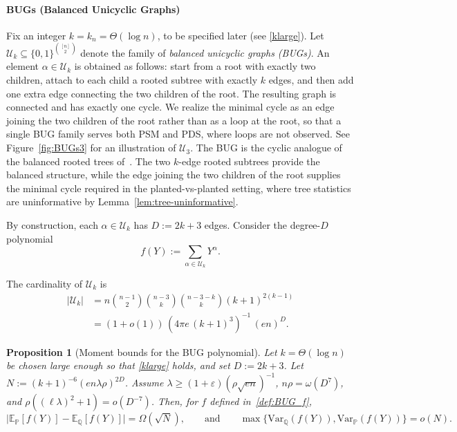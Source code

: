 \documentclass[11pt, letterpaper]{article}
\newtheorem{proposition}[theorem]{Proposition}
\numberwithin{equation}{section}
\newcommand{\E}{\mathbb{E}}
\newcommand{\PP}{\mathbb{P}}
\newcommand{\QQ}{\mathbb{Q}}
\begin{document}
\paragraph*{ 
BUGs (Balanced Unicyclic Graphs)}
Fix an integer $k=k_n=\Theta(\log n)$, to be specified later (see \eqref{klarge}). Let $\mathcal{U}_k \subseteq \{0,1\}^{\binom{[n]}{2}}$
denote the family of \emph{balanced unicyclic graphs (BUGs)}. An element $\alpha\in\mathcal{U}_k$ is obtained as follows:
start from a root with exactly two children, attach to each child a rooted subtree with exactly $k$ edges, and then add one extra edge connecting the two children of the root. The resulting graph is connected and has exactly one cycle. We realize the minimal cycle as an edge joining the two children of the root rather than as a loop at the root, so that a single BUG family serves both PSM and PDS, where loops are not observed. See Figure~\ref{fig:BUGs3} for an illustration of $\mathcal{U}_3$. The BUG is the cyclic analogue of the balanced rooted trees of~\cite{sohn2025sharp}. The two $k$-edge rooted subtrees provide the balanced structure, while the edge joining the two children of the root supplies the minimal cycle required in the planted-vs-planted setting, where tree statistics are uninformative by Lemma~\ref{lem:tree-uninformative}.

\noindent By construction, each $\alpha\in\mathcal{U}_k$ has $D := 2k+3$
edges. Consider the degree-$D$ polynomial
\begin{equation}\label{def:BUG_f}
f(Y) := \sum_{\alpha\in\mathcal{U}_k} Y^\alpha .
\end{equation}

\noindent The cardinality of $\mathcal U_k$ is
\begin{align}\label{eq:size-U_k-app}
|\mathcal{U}_k|
\nonumber &= n \binom{n-1}{2}  \binom{n-3}{k} \binom{n-3-k}{k} (k+1)^{2(k-1)}\\
 &= (1+o(1))\,\left(4\pi e\,(k+1)^3\right)^{-1}\,(en)^D.
\end{align}

\begin{proposition}[Moment bounds for the BUG polynomial]\label{prop:BUG-moments} Let $k=\Theta(\log n)$ be chosen large enough so that \eqref{klarge} holds, and set $D:=2k+3$. Let $N:=(k+1)^{-6}(en\lambda\rho)^{2D}$. Assume $\lambda \ge (1+\varepsilon)(\rho\sqrt{en})^{-1}$, $n\rho=\omega(D^7)$, and $\rho\left((\ell\lambda)^2+1\right)=o(D^{-7})$. Then, for $f$ defined in~\eqref{def:BUG_f},
\[
\bigl|\E_{\PP}[f(Y)]-\E_{\QQ}[f(Y)]\bigr|  =  \Omega(\sqrt{N}),
\qquad\text{and}\qquad
\max\{\mathrm{Var}_{\QQ}(f(Y)),\mathrm{Var}_{\PP}(f(Y))\} =  o(N).
\]
\end{proposition}
\end{document}
